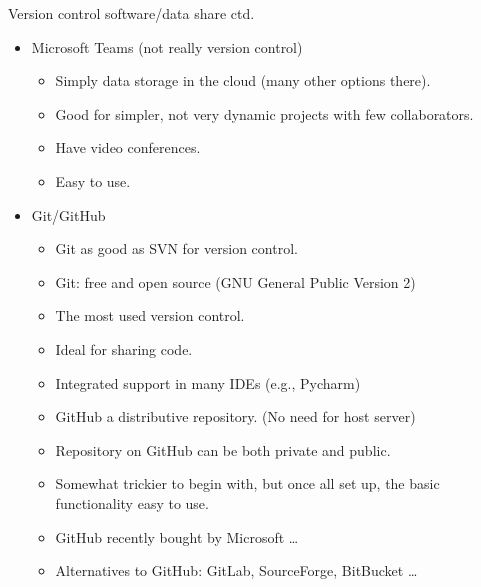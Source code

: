 \documentclass{beamer}
\begin{document}
\begin{frame}{Version control software/data share ctd.}
  \begin{itemize}
  \item Microsoft Teams (not really version control)
    \begin{itemize}
    \item Simply data storage in the cloud (many other options there).
    \item Good for simpler, not very dynamic projects with few collaborators.
    \item Have video conferences.
   \item Easy to use.
    \end{itemize}
\item Git/GitHub
  \begin{itemize}
  \item Git as good as SVN for version control.
  \item Git: free and open source (GNU General Public Version 2)
   \item The most used version control.   
   \item Ideal for sharing code.
   \item Integrated support in many IDEs (e.g., Pycharm)
   \item GitHub a distributive repository. (No need for host server)
    \item Repository on GitHub can be both private and public.
    \item Somewhat trickier to begin with, but once all set up, the basic functionality easy to use.
    \item GitHub recently bought by Microsoft \dots
    \item Alternatives to GitHub: GitLab, SourceForge, BitBucket \dots
  \end{itemize}
  \end{itemize}
\end{frame}
\end{document}
